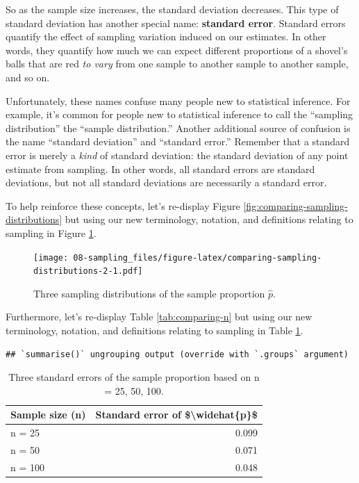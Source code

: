 \documentclass[
]{book}
\begin{document}
So as the sample size increases, the standard deviation decreases. This type of standard deviation has another special name:  \textbf{standard error}. Standard errors quantify the effect of sampling variation induced on our estimates. In other words, they quantify how much we can expect different proportions of a shovel's balls that are red \emph{to vary} from one sample to another sample to another sample, and so on.

Unfortunately, these names confuse many people new to statistical inference. For example, it's common for people new to statistical inference to call the ``sampling distribution'' the ``sample distribution.'' Another additional source of confusion is the name ``standard deviation'' and ``standard error.'' Remember that a standard error is merely a \emph{kind} of standard deviation: the standard deviation of any point estimate from sampling. In other words, all standard errors are standard deviations, but not all standard deviations are necessarily a standard error.

To help reinforce these concepts, let's re-display Figure \ref{fig:comparing-sampling-distributions} but using our new terminology, notation, and definitions relating to sampling in Figure \ref{fig:comparing-sampling-distributions-2}.

\begin{figure}
\centering
\texttt{[image: 08-sampling\_files/figure-latex/comparing-sampling-distributions-2-1.pdf]}
\caption{\label{fig:comparing-sampling-distributions-2}Three sampling distributions of the sample proportion \(\widehat{p}\).}
\end{figure}

Furthermore, let's re-display Table \ref{tab:comparing-n} but using our new terminology, notation, and definitions relating to sampling in Table \ref{tab:comparing-n-2}.

\begin{verbatim}
## `summarise()` ungrouping output (override with `.groups` argument)
\end{verbatim}

\begin{table}[!h]

\caption{\label{tab:comparing-n-2}Three standard errors of the sample proportion based on n = 25, 50, 100.}
\centering
\fontsize{10}{12}\selectfont
\begin{tabular}[t]{lr}
\toprule
Sample size (n) & Standard error of \$\textbackslash{}widehat\{p\}\$\\
\midrule
n = 25 & 0.099\\
n = 50 & 0.071\\
n = 100 & 0.048\\
\bottomrule
\end{tabular}
\end{table}
\end{document}
